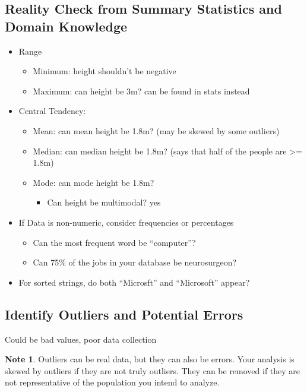 \documentclass[11pt]{article}
\theoremstyle{definition}
\newtheorem{note}{Note}
\begin{document}
\subsection{Reality Check from Summary Statistics and Domain Knowledge}
\begin{itemize}
    \item Range
    \begin{itemize}
        \item Minimum: height shouldn't be negative
        \item Maximum: can height be 3m? can be found in stats instead
    \end{itemize}
    \item Central Tendency:
    \begin{itemize}
        \item Mean: can mean height be 1.8m? (may be skewed by some outliers)
        \item Median: can median height be 1.8m? (says that half of the people are >= 1.8m)
        \item Mode: can mode height be 1.8m?
        \begin{itemize}
            \item Can height be multimodal? yes
        \end{itemize}
    \end{itemize}
    \item If Data is non-numeric, consider frequencies or percentages
    \begin{itemize}
        \item Can the most frequent word be “computer”?
        \item Can 75\% of the jobs in your database be neurosurgeon?
    \end{itemize}
    \item For sorted strings, do both “Microsft” and “Microsoft” appear?
\end{itemize}
\subsection{Identify Outliers and Potential Errors}
Could be bad values, poor data collection
\begin{note}
    Outliers can be real data, but they can also be errors. Your analysis is skewed by outliers if they are not truly outliers.
    They can be removed if they are not representative of the population you intend to analyze.
\end{note}
\end{document}
